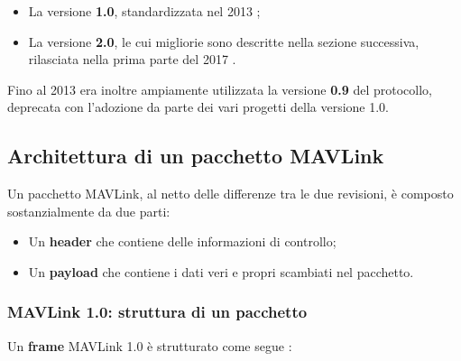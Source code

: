 \documentclass[a4paper, 12pt, oneside]{article}
\theoremstyle{definition}
\begin{document}
\begin{itemize}
    \item La versione \textbf{1.0}, standardizzata nel 2013 \cite{mavlink-versions};
    \item La versione \textbf{2.0}, le cui migliorie sono descritte nella sezione successiva, rilasciata nella prima parte del 2017 \cite{mavlink-2}.
\end{itemize}

Fino al 2013 era inoltre ampiamente utilizzata la versione \textbf{0.9} del protocollo, deprecata con l'adozione da parte dei vari progetti della versione 1.0.

\newpage
\subsection{Architettura di un pacchetto MAVLink}

Un pacchetto MAVLink, al netto delle differenze tra le due revisioni, è composto sostanzialmente da due parti:

\begin{itemize}
    \item Un \textbf{header} che contiene delle informazioni di controllo;
    \item Un \textbf{payload} che contiene i dati veri e propri scambiati nel pacchetto.
\end{itemize}

\subsubsection{MAVLink 1.0: struttura di un pacchetto}
Un \textbf{frame} MAVLink 1.0 è strutturato come segue \cite{mavlink-1-packet}:
\end{document}
